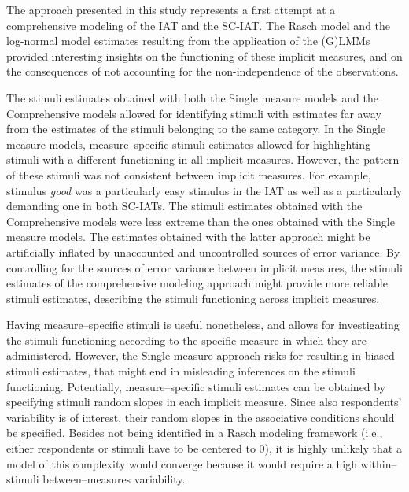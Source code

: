 \documentclass[12pt]{book}
\begin{document}
The approach presented in this study represents a first attempt at a comprehensive modeling of the IAT and the SC-IAT. 
The Rasch model and the log-normal model estimates resulting from the application of the (G)LMMs provided interesting insights on the functioning of these implicit measures, and on the consequences of not accounting for the non-independence of the observations. 

The stimuli estimates obtained with both the Single measure models and the Comprehensive models allowed for identifying stimuli with estimates far away from the estimates of the stimuli belonging to the same category. In the Single measure models, measure--specific stimuli estimates allowed for highlighting stimuli with a different functioning in all implicit measures. However, the pattern of these stimuli was not consistent between implicit measures. 
For example,  stimulus \emph{good} was a particularly easy stimulus in the IAT as well as a particularly demanding one in both SC-IATs.  
The stimuli estimates obtained with the Comprehensive models were less extreme than the ones obtained with the Single measure models.
The estimates obtained with the latter approach might be artificially inflated by unaccounted and uncontrolled sources of error variance. 
By controlling for the sources of error variance between implicit measures, the stimuli estimates of the comprehensive modeling approach might provide more reliable stimuli estimates, describing the stimuli functioning across implicit measures.

Having measure--specific stimuli is useful nonetheless, and allows for investigating the stimuli functioning according to the specific measure in which they are administered. 
However, the Single measure approach risks for resulting in biased stimuli estimates, that might end in misleading inferences on the stimuli functioning. 
Potentially, measure--specific stimuli estimates can be obtained by specifying stimuli random slopes in  each implicit measure. 
Since also respondents' variability is of interest, their random slopes in the associative conditions should be specified. 
Besides not being identified in a Rasch modeling framework (i.e., either respondents or stimuli have to be centered to 0), it is highly unlikely that a model of this complexity would converge because it would require a high within--stimuli between--measures variability.
\end{document}

